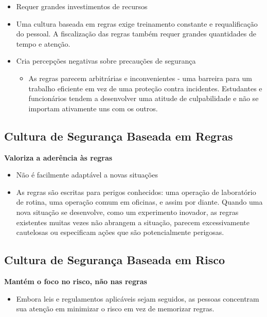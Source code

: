 \documentclass[
  letterpaper,
  DIV=11,
  numbers=noendperiod]{scrartcl}
\providecommand{\tightlist}{%
  \setlength{\itemsep}{0pt}\setlength{\parskip}{0pt}}\usepackage{longtable,booktabs,array}
\begin{document}
\begin{itemize}
\item
  Requer grandes investimentos de recursos
\item
  Uma cultura baseada em regras exige treinamento constante e
  requalificação do pessoal. A fiscalização das regras também requer
  grandes quantidades de tempo e atenção.
\item
  Cria percepções negativas sobre precauções de segurança

  \begin{itemize}
  \tightlist
  \item
    As regras parecem arbitrárias e inconvenientes - uma barreira para
    um trabalho eficiente em vez de uma proteção contra incidentes.
    Estudantes e funcionários tendem a desenvolver uma atitude de
    culpabilidade e não se importam ativamente uns com os outros.
  \end{itemize}
\end{itemize}

\subsection{Cultura de Segurança Baseada em
Regras}\label{cultura-de-seguranuxe7a-baseada-em-regras-2}

\textbf{Valoriza a aderência às regras}

\begin{itemize}
\item
  Não é facilmente adaptável a novas situações
\item
  As regras são escritas para perigos conhecidos: uma operação de
  laboratório de rotina, uma operação comum em oficinas, e assim por
  diante. Quando uma nova situação se desenvolve, como um experimento
  inovador, as regras existentes muitas vezes não abrangem a situação,
  parecem excessivamente cautelosas ou especificam ações que são
  potencialmente perigosas.
\end{itemize}

\subsection{Cultura de Segurança Baseada em
Risco}\label{cultura-de-seguranuxe7a-baseada-em-risco}

\textbf{Mantém o foco no risco, não nas regras}

\begin{itemize}
\tightlist
\item
  Embora leis e regulamentos aplicáveis sejam seguidos, as pessoas
  concentram sua atenção em minimizar o risco em vez de memorizar
  regras.
\end{itemize}
\end{document}
